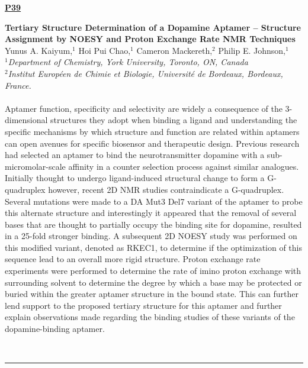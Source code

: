 \documentclass[titlepage,oneside,openany,10pt]{book}
\newenvironment{posterabs}[4] %
        {
	\begin{flushright}
                \underline{\textbf{#4}}
        \end{flushright}
        \textbf{#1}\\%
        #2\\%
        \textit{#3}\\\\%
        }
        {
        \\
        \noindent\rule{15cm}{0.5pt}%
        }
\begin{document}
\begin{posterabs}
    {Tertiary Structure Determination of a Dopamine Aptamer -- Structure Assignment by NOESY and Proton Exchange Rate NMR Techniques}
    {Yunus A. Kaiyum,$^{1}$ Hoi Pui Chao,$^{1}$ Cameron Mackereth,$^{2}$ Philip E. Johnson,$^{1}$}
    {
    $^1$Department of Chemistry, York University, Toronto, ON, Canada\\
    $^2$Institut Europ\'{e}en de Chimie et Biologie, Universit\'{e} de Bordeaux, Bordeaux, France.
    }
    {P39}
    Aptamer function, specificity and selectivity are widely a consequence of the 3-dimensional structures they adopt when binding a ligand and understanding the specific mechanisms by which structure and function are related within aptamers can open avenues for specific biosensor and therapeutic design. Previous research had selected an aptamer to bind the neurotransmitter dopamine with a sub-micromolar-scale affinity in a counter selection process against similar analogues. Initially thought to undergo ligand-induced structural change to form a G-quadruplex however, recent 2D NMR studies contraindicate a G-quadruplex. Several mutations were made to a DA Mut3 Del7 variant of the aptamer to probe this alternate structure and interestingly it appeared that the removal of several bases that are thought to partially occupy the binding site for dopamine, resulted in a 25-fold stronger binding. A subsequent 2D NOESY study was performed on this modified variant, denoted as RKEC1, to determine if the optimization of this sequence lead to an overall more rigid structure. Proton exchange rate experiments were performed to determine the rate of imino proton exchange with surrounding solvent to determine the degree by which a base may be protected or buried within the greater aptamer structure in the bound state. This can further lend support to the proposed tertiary structure for this aptamer and further explain observations made regarding the binding studies of these variants of the dopamine-binding aptamer.
    \label{KaiyumY}
\end{posterabs}

\newpage
\end{document}
